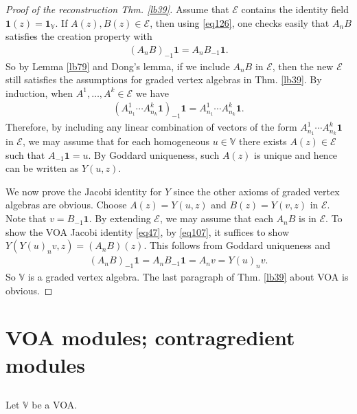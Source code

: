 \documentclass[11pt,b5paper,notitlepage]{article}
\theoremstyle{definition}
\theoremstyle{plain}
\newcommand{\mc}{\mathcal}
\newcommand{\id}{\mathbf{1}}
\newcommand{\Vbb}{\mathbb V}
\numberwithin{equation}{section}
\begin{document}
\begin{proof}[Proof of the reconstruction Thm. \ref{lb39}]
Assume that $\mc E$ contains the identity field $\id(z)=\id_\Vbb$. If $A(z),B(z)\in\mc E$, then using \eqref{eq126}, one checks easily that $A_nB$ satisfies the creation property with
\begin{align}
(A_nB)_{-1}\id=A_nB_{-1}\id.
\end{align}
So by Lemma \ref{lb79} and Dong's lemma, if we include $A_nB$ in $\mc E$, then the new $\mc E$ still satisfies the assumptions for graded vertex algebras in Thm. \ref{lb39}. By induction, when $A^1,\dots,A^k\in\mc E$  we have
\begin{align}
(A^1_{n_1}\cdots A^k_{n_k}\id)_{-1}\id=	A^1_{n_1}\cdots A^k_{n_k}\id.
\end{align}
Therefore, by including any linear combination of vectors of the form $A^1_{n_1}\cdots A^k_{n_k}\id$ in $\mc E$, we may assume that for each homogeneous $u\in\Vbb$ there exists  $A(z)\in\mc E$ such that $A_{-1}\id=u$. By Goddard uniqueness, such $A(z)$ is unique and hence can be written as $Y(u,z)$.

We now prove the Jacobi identity for $Y$ since the other axioms of graded vertex algebras are obvious. Choose $A(z)=Y(u,z)$ and $B(z)=Y(v,z)$ in $\mc E$.  Note that $v=B_{-1}\id$. By extending $\mc E$, we may assume that each $A_nB$ is in $\mc E$. To show the VOA Jacobi identity \eqref{eq47},  by \eqref{eq107}, it suffices to show $Y(Y(u)_nv,z)=(A_nB)(z)$. This follows from Goddard uniqueness and
\begin{align*}
(A_nB)_{-1}\id=A_nB_{-1}\id=A_nv=Y(u)_nv.	
\end{align*}
So $\Vbb$ is a graded vertex algebra. The last paragraph of Thm. \ref{lb39} about VOA is obvious.
\end{proof}



\section{VOA modules; contragredient modules}\label{lb192}

\subsection{}

Let $\Vbb$ be a VOA. 
\end{document}
